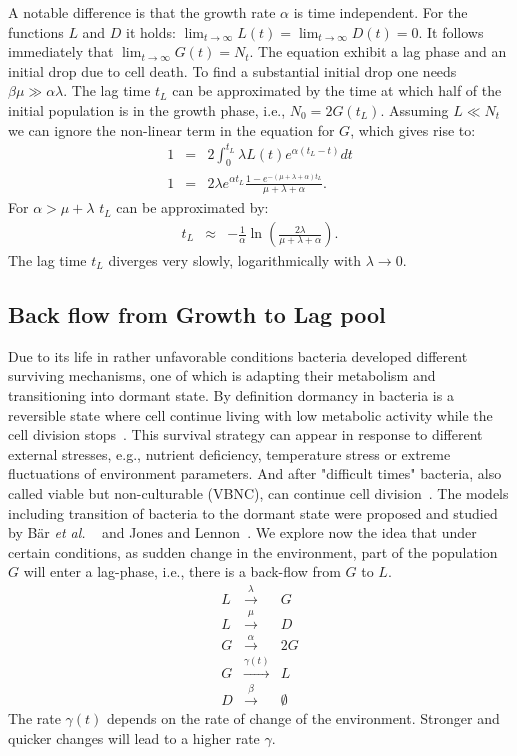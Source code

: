 \documentclass[10pt,A4paper]{article}
\numberwithin{equation}{section}
\newcommand{\etal}{{\textit{et al. }}}
\begin{document}
A notable difference is that the growth rate $\alpha$ is time independent.
For the functions $L$ and $D$ it holds: $\lim_{t\to\infty} L(t) = \lim_{t\to\infty} D(t) = 0$.
It follows immediately that $\lim_{t\to\infty} G(t) = N_t$.
The equation exhibit a lag phase and an initial drop due to cell death.
To find a substantial initial drop one needs $\beta \mu \gg \alpha \lambda$.
The lag time $t_L$ can be approximated by the time at which half of the initial population is in the growth phase, i.e., $N_0=2G(t_L)$.
Assuming $L\ll N_t$ we can ignore the non-linear term in the equation for $G$, which gives rise to:
\begin{eqnarray}
    1&=& 2\int_0^{t_L} \lambda L(t)e^{\alpha(t_L-t)}dt\\
    1  &=& 2\lambda e^{\alpha t_L}\frac{1-e^{-(\mu+\lambda+\alpha)t_L}}{\mu+\lambda+\alpha}.
\end{eqnarray}
For $\alpha > \mu+\lambda$ $t_L$ can be approximated by:
\begin{eqnarray}
    t_L &\approx& -\frac{1}{\alpha}\ln\left(\frac{2\lambda}{\mu+\lambda+\alpha}\right).
\end{eqnarray}
The lag time $t_L$ diverges very slowly, logarithmically with $\lambda\to 0$.
%
%
%
\subsection{Back flow from Growth to Lag pool}
Due to its life in rather unfavorable conditions bacteria developed different surviving mechanisms, one of which is adapting their metabolism and transitioning into dormant state.
By definition dormancy in bacteria is a reversible state where cell continue living with low metabolic activity while the cell division stops~\cite{kaprelyants_dormancy_1993}.
This survival strategy can appear in response to different external stresses, e.g., nutrient deficiency, temperature stress or extreme fluctuations of environment parameters.
And after "difficult times" bacteria, also called viable but non-culturable (VBNC), can continue cell division~\cite{kell_viability_1998}.
The models including transition of bacteria to the dormant state were proposed and studied by Bär \etal~\cite{bar_modelling_2002} and Jones and Lennon~\cite{jones_dormancy_2010}.
%
We explore now the idea that under certain conditions, as sudden change in the environment, part of the population $G$ will enter a lag-phase, i.e., there is a back-flow from $G$ to $L$.
\begin{eqnarray}
    L &\stackrel{\lambda}{\longrightarrow} & G\\
    L &\stackrel{\mu}{\longrightarrow} & D\\
    G &\stackrel{\alpha}{\longrightarrow} & 2G\\
    G &\stackrel{\gamma(t)}{\longrightarrow} & L\\
    D &\stackrel{\beta}{\longrightarrow} & \emptyset
\label{eq:reactions_backlag}
\end{eqnarray}
The rate $\gamma(t)$ depends on the rate of change of the environment.
Stronger and quicker changes will lead to a higher rate $\gamma$.
%
%
\end{document}
